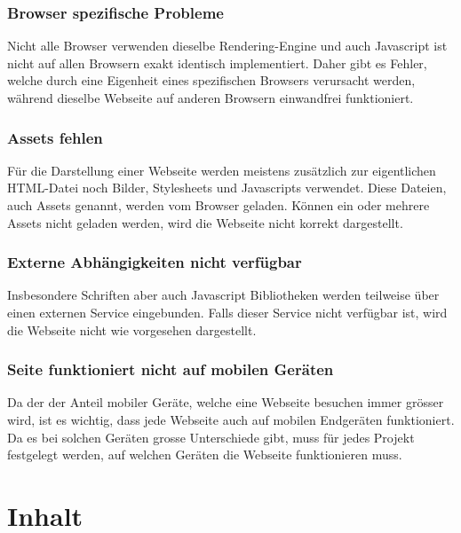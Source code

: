 \subsubsection{Browser spezifische Probleme}
\label{ssub:browserspezifischeprobleme}
Nicht alle Browser verwenden dieselbe Rendering-Engine und auch Javascript ist nicht auf allen Browsern exakt identisch implementiert. Daher gibt es Fehler, welche durch eine Eigenheit eines spezifischen Browsers verursacht werden, während dieselbe Webseite auf anderen Browsern einwandfrei funktioniert.

\subsubsection{Assets fehlen}
\label{ssub:assetsfehlen}
Für die Darstellung einer Webseite werden meistens zusätzlich zur eigentlichen HTML-Datei noch Bilder, Stylesheets und Javascripts verwendet. Diese Dateien, auch Assets genannt, werden vom Browser geladen. Können ein oder mehrere Assets nicht geladen werden, wird die Webseite nicht korrekt dargestellt.

\subsubsection{Externe Abhängigkeiten nicht verfügbar}
\label{ssub:externeabhaengigkeiten_nicht_verfügbar}
Insbesondere Schriften aber auch Javascript Bibliotheken werden teilweise über einen externen Service eingebunden. Falls dieser Service nicht verfügbar ist, wird die Webseite nicht wie vorgesehen dargestellt.

\subsubsection{Seite funktioniert nicht auf mobilen Geräten}
\label{ssub:seitefunktioniertnichtaufmobilengeraeten}
Da der der Anteil mobiler Geräte, welche eine Webseite besuchen immer grösser wird, ist es wichtig, dass jede Webseite auch auf mobilen Endgeräten funktioniert. Da es bei solchen Geräten grosse Unterschiede gibt, muss für jedes Projekt festgelegt werden, auf welchen Geräten die Webseite funktionieren muss.


\section{Inhalt}
\label{sec:inhalt}

